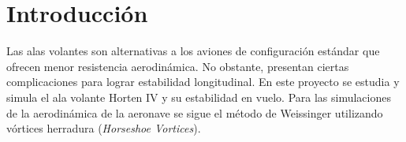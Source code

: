 
\section{Introducción}

Las alas volantes son alternativas a los aviones de configuración estándar que ofrecen menor resistencia aerodinámica. No obstante, presentan ciertas complicaciones para lograr estabilidad longitudinal. En este proyecto se estudia y simula el ala volante Horten IV y su estabilidad en vuelo. Para las simulaciones de la aerodinámica de la aeronave se sigue el método de Weissinger utilizando vórtices herradura (\emph{Horseshoe Vortices}).


